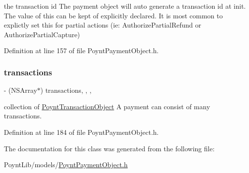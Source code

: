 the transaction id  The payment object will auto generate a transaction id at init. The value of this can be kept of explicitly declared. It is most common to explictly set this for partial actions (ie\+: Authorize\+Partial\+Refund or Authorize\+Partial\+Capture) 



Definition at line 157 of file Poynt\+Payment\+Object.\+h.

\hypertarget{interface_poynt_payment_object_a12474d50a1838843bcc1cacbbc30c4d2}{}\label{interface_poynt_payment_object_a12474d50a1838843bcc1cacbbc30c4d2} 
\subsubsection{\texorpdfstring{transactions}{transactions}}
{\footnotesize\ttfamily -\/ (N\+S\+Array$\ast$) transactions\hspace{0.3cm}{\ttfamily [read]}, {\ttfamily [write]}, {\ttfamily [nonatomic]}, {\ttfamily [strong]}}



collection of \hyperlink{interface_poynt_transaction_object}{Poynt\+Transaction\+Object}  A payment can consist of many transactions. 



Definition at line 184 of file Poynt\+Payment\+Object.\+h.



The documentation for this class was generated from the following file\+:\begin{DoxyCompactItemize}
\item 
Poynt\+Lib/models/\hyperlink{_poynt_payment_object_8h}{Poynt\+Payment\+Object.\+h}\end{DoxyCompactItemize}
